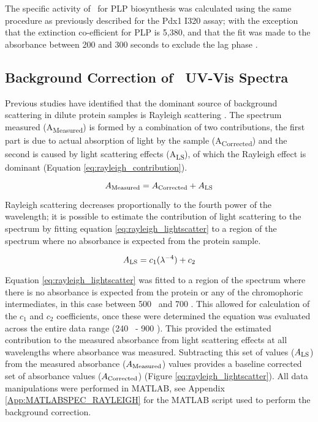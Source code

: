 The specific activity of \atpdx ~for PLP biosynthesis was calculated using the same procedure as previously described for the Pdx1 I320 assay; with the exception that the extinction co-efficient for PLP is 5,380, and that the fit was made to the absorbance between 200 and 300 seconds to exclude the lag phase \cite{Raschle2007}.
\clearpage		
		\subsection{Background Correction of \atpdx ~UV-Vis Spectra}\label{sec:bg}
 Previous studies have identified that the dominant source of background scattering in dilute protein samples is Rayleigh scattering \cite{Leach1960, Porterfield2010}. The spectrum measured (A\textsubscript{Measured}) is formed by a combination of two contributions, the first part is due to actual absorption of light by the sample (A\textsubscript{Corrected}) and the second is caused by light scattering effects (A\textsubscript{LS}), of which the Rayleigh effect is dominant \cite{Porterfield2010} (Equation \ref{eq:rayleigh_contribution}).


\begin{equation}\label{eq:rayleigh_contribution}
A\textsubscript{Measured} = A\textsubscript{Corrected} + A\textsubscript{LS}
\end{equation}

Rayleigh scattering decreases proportionally to the fourth power of the wavelength; it is possible to estimate the contribution of light scattering to the spectrum by fitting equation \ref{eq:rayleigh_lightscatter} to a region of the spectrum where no absorbance is expected from the protein sample.   

\begin{equation}\label{eq:rayleigh_lightscatter}
A\textsubscript{LS} = c_{1}(\lambda^{-4}) + c_{2}
\end{equation}

Equation \ref{eq:rayleigh_lightscatter} was fitted to a region of the spectrum where there is no absorbance is expected from the protein or any of the chromophoric intermediates, in this case between 500 \nm ~and 700 \nm . This allowed for calculation of the $c_{1}$ and $c_{2}$ coefficients, once these were determined the equation was evaluated across the entire  data range (240 \nm ~- 900 \nm ). This provided the estimated contribution to the measured absorbance from light scattering effects at all wavelengths where absorbance was measured. Subtracting this set of values ($A\textsubscript{LS}$) from the measured absorbance ($A\textsubscript{Measured}$) values provides a baseline corrected set of absorbance values ($A\textsubscript{Corrected}$) (Figure \ref{eq:rayleigh_lightscatter}). All data manipulations were performed in MATLAB, see Appendix \ref{App:MATLABSPEC_RAYLEIGH} for the MATLAB script used to perform the background correction. 

